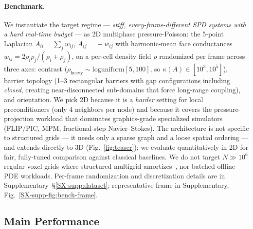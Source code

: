 \documentclass[acmtog]{acmart}
\theoremstyle{plain}
\begin{document}
\paragraph{Benchmark.}
We instantiate the target regime --- \emph{stiff, every-frame-different SPD systems with
a hard real-time budget} --- as 2D multiphase pressure-Poisson: the 5-point Laplacian
$A_{ii}\!=\!\sum_j w_{ij}$, $A_{ij}\!=\!-w_{ij}$ with harmonic-mean face conductances
$w_{ij}\!=\!2\rho_i\rho_j/(\rho_i\!+\!\rho_j)$, on a per-cell density field $\rho$
randomized per frame across three axes: contrast
($\rho_{\text{heavy}}\!\sim\!\mathrm{loguniform}[5,100]$, so
$\kappa(A)\!\in\![10^3,10^5]$), barrier topology (1--3 rectangular barriers with
gap configurations including \emph{closed}, creating near-disconnected sub-domains that
force long-range coupling), and orientation. We pick 2D because it is a \emph{harder}
setting for local preconditioners (only 4 neighbors per node) and because it covers the
pressure-projection workload that dominates graphics-grade specialized simulators
(FLIP/PIC, MPM, fractional-step Navier--Stokes). The architecture is not specific to
structured grids --- it needs only a sparse graph and a loose spatial ordering --- and
extends directly to 3D (Fig.~\ref{fig:teaser}); we evaluate quantitatively in 2D for
fair, fully-tuned comparison against classical baselines. We do not target
$N\!\gg\!10^6$ regular voxel grids where structured multigrid
amortizes~\cite{Lyu2026multigrid}, nor batched offline PDE workloads. Per-frame
randomization and discretization details are in
Supplementary~\S\ref{SX-supp:dataset}; representative frame in
Supplementary, Fig.~\ref{SX-supp-fig:bench-frame}.

\subsection{Main Performance}
\label{sec:results:perf}
\end{document}

